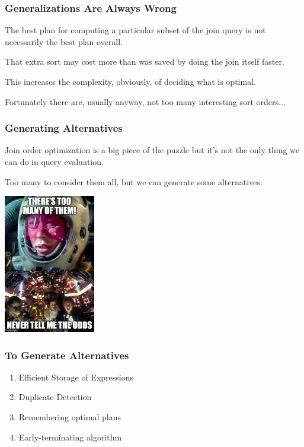\begin{frame}
\frametitle{Generalizations Are Always Wrong}

The best plan for computing a particular subset of the join query is not necessarily the best plan overall. 

That extra sort may cost more than was saved by doing the join itself faster. 

This increases the complexity, obviously, of deciding what is optimal. 

Fortunately there are, usually anyway, not too many interesting sort orders...


\end{frame}

\begin{frame}
\frametitle{Generating Alternatives}

Join order optimization is a big piece of the puzzle but it's not the only thing we can do in query evaluation. 

Too many to consider them all, but we can generate some alternatives.
\begin{center}
	\includegraphics[width=0.3\textwidth]{images/toomany.jpg}
\end{center}

\end{frame}

\begin{frame}
\frametitle{To Generate Alternatives}

\begin{enumerate}
	\item Efficient Storage of Expressions
	\item Duplicate Detection
	\item Remembering optimal plans
	\item Early-terminating algorithm
\end{enumerate}


\end{frame}


